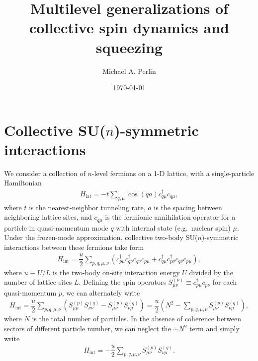 \documentclass[nofootinbib,notitlepage,11pt]{revtex4-2}
\renewcommand{\t}{\text} %
\newcommand{\f}[2]{\dfrac{#1}{#2}} %
\newcommand{\p}[1]{\left(#1\right)} %
\newcommand{\1}{\mathds{1}}
\begin{document}
\thispagestyle{fancy}

\title{Multilevel generalizations of collective spin dynamics and
  squeezing}%
\author{Michael A. Perlin}%
\date{\today}

\maketitle

\tableofcontents

\section{Collective SU($n$)-symmetric interactions}
\label{sec:int}

We consider a collection of $n$-level fermions on a 1-D lattice, with
a single-particle Hamiltonian
\begin{align}
  H_{\t{lat}} = -t \sum_{q,\mu} \cos\p{qa} c_{q\mu}^\dag c_{q\mu},
  \label{eq:H_lat}
\end{align}
where $t$ is the nearest-neighbor tunneling rate, $a$ is the spacing
between neighboring lattice sites, and $c_{q\mu}$ is the fermionic
annihilation operator for a particle in quasi-momentum mode $q$ with
internal state (e.g.~nuclear spin) $\mu$.  Under the frozen-mode
approximation, collective two-body SU($n$)-symmetric interactions
between these fermions take form
\begin{align}
  H_{\t{int}} = \f{u}{2} \sum_{p,q,\mu,\nu}
  \p{c_{p\mu}^\dag c_{q\nu}^\dag c_{q\nu} c_{p\mu}
    + c_{q\mu}^\dag c_{p\nu}^\dag c_{q\nu} c_{p\mu}},
\end{align}
where $u\equiv U/L$ is the two-body on-site interaction energy $U$
divided by the number of lattice sites $L$.  Defining the spin
operators $S_{\mu\nu}^{(p)}\equiv c_{p\mu}^\dag c_{p\nu}$ for each
quasi-momentum $p$, we can alternately write
\begin{align}
  H_{\t{int}} = \f{u}{2} \sum_{p,q,\mu,\nu}
  \p{S_{\mu\mu}^{(p)} S_{\nu\nu}^{(q)} - S_{\mu\nu}^{(p)} S_{\nu\mu}^{(q)}}
  = \f{u}{2}\p{N^2 - \sum_{p,q,\mu,\nu}
    S_{\mu\nu}^{(p)} S_{\nu\mu}^{(q)}},
\end{align}
where $N$ is the total number of particles.  In the absence of
coherence between sectors of different particle number, we can neglect
the $\sim N^2$ term and simply write
\begin{align}
  H_{\t{int}}
  = - \f{u}{2} \sum_{p,q,\mu,\nu} S_{\mu\nu}^{(p)} S_{\nu\mu}^{(q)}.
\end{align}
\end{document}
